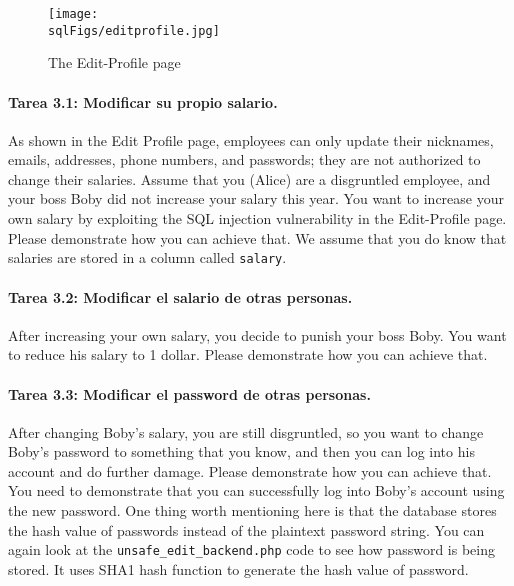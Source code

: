 \begin{figure}[htb]
\begin{center}
  \texttt{[image: \\sqlFigs/editprofile.jpg]}
\end{center}
\caption{The Edit-Profile page}
\label{sql:fig:edit}
\end{figure}
 


\paragraph{Tarea 3.1: Modificar su propio salario.}  
As shown in the Edit Profile page,
employees can only update their nicknames, emails, addresses, phone numbers, and
passwords; they are not authorized to change their salaries.  
Assume that you (Alice) are a disgruntled employee, and your boss Boby did not 
increase your salary this year. You want to increase your own salary 
by exploiting the SQL injection vulnerability in
the Edit-Profile page. Please demonstrate how you can achieve that.
We assume that you do know that salaries are stored in 
a column called \texttt{salary}.


\paragraph{Tarea 3.2: Modificar el salario de otras personas.}
After increasing your own salary, you decide to punish your boss Boby. You want to reduce his
salary to 1 dollar. Please demonstrate how you can achieve that. 



\paragraph{Tarea 3.3: Modificar el password de otras personas.}
After changing Boby's salary, you are still disgruntled, so you
want to change Boby's password to something that you know, and then you can log into his account
and do further damage. Please demonstrate how you can achieve that.
You need to demonstrate that you can 
successfully log into Boby's account using the new
password.  One thing worth mentioning here is that the database stores the hash value of
passwords instead of the plaintext password string. You can again look at
the {\tt unsafe\_edit\_backend.php} code to see how password is being stored. It
uses SHA1 hash function to generate the hash value of password. 




